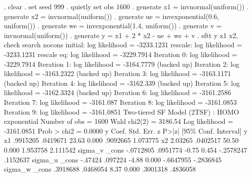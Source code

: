 . clear
{\smallskip}
. set seed 999
{\smallskip}
. quietly set obs 1600
{\smallskip}
. generate x1 = invnormal(uniform())
{\smallskip}
. generate x2 = invnormal(uniform())
{\smallskip}
. generate ue = invexponential(0.6, uniform())
{\smallskip}
. generate we = invexponential(1.4, uniform())
{\smallskip}
. generate v = invnormal(uniform())
{\smallskip}
. generate y = x1 + 2 * x2 - ue + we + v
{\smallskip}
. sftt y x1 x2, check search nocons
{\smallskip}
initial:       log likelihood = -3233.1231
rescale:       log likelihood = -3233.1231
rescale eq:    log likelihood = -3229.7914
Iteration 0:   log likelihood = -3229.7914  
Iteration 1:   log likelihood = -3164.7779  (backed up)
Iteration 2:   log likelihood = -3163.2322  (backed up)
Iteration 3:   log likelihood = -3163.1171  (backed up)
Iteration 4:   log likelihood =  -3162.339  (backed up)
Iteration 5:   log likelihood = -3162.3324  (backed up)
Iteration 6:   log likelihood = -3161.2586  
Iteration 7:   log likelihood =  -3161.087  
Iteration 8:   log likelihood = -3161.0853  
Iteration 9:   log likelihood = -3161.0851  
{\smallskip}
Two-tiered SF Model (2TSF) : HOMO exponential     Number of obs   =       1600
                                                  Wald chi2(2)    =    3186.54
Log likelihood = -3161.0851                       Prob > chi2     =     0.0000
{\smallskip}
           y {\VBAR}      Coef.   Std. Err.      z    P>|z|     [95\% Conf. Interval]
y            {\VBAR}
          x1 {\VBAR}   .9915205   .0419671    23.63   0.000     .9092665    1.073775
          x2 {\VBAR}    2.03265   .0402517    50.50   0.000     1.953758    2.111542
sigma_v      {\VBAR}
       _cons {\VBAR}  -.0712805   .0951774    -0.75   0.454    -.2578247    .1152637
sigma_u      {\VBAR}
       _cons {\VBAR}    -.47424    .097224    -4.88   0.000    -.6647955   -.2836845
sigma_w      {\VBAR}
       _cons {\VBAR}   .3918688   .0468054     8.37   0.000     .3001318    .4836058
